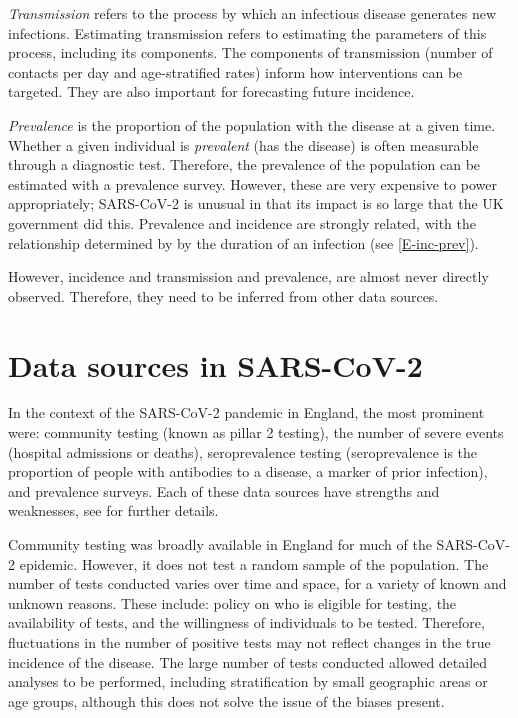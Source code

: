 \documentclass[thesis.tex]{subfiles}
\begin{document}
\emph{Transmission} refers to the process by which an infectious disease generates new infections.
Estimating transmission refers to estimating the parameters of this process, including its components.
The components of transmission (\eg number of contacts per day and age-stratified rates) inform how interventions can be targeted.
They are also important for forecasting future incidence.

\emph{Prevalence} is the proportion of the population with the disease at a given time.
Whether a given individual is \emph{prevalent} (has the disease) is often measurable through a diagnostic test.
Therefore, the prevalence of the population can be estimated with a prevalence survey.
However, these are very expensive to power appropriately; SARS-CoV-2 is unusual in that its impact is so large that the UK government did this.
Prevalence and incidence are strongly related, with the relationship determined by by the duration of an infection (see \cref{E-inc-prev}).


However, incidence and transmission and prevalence, are almost never directly observed.
Therefore, they need to be inferred from other data sources.

\section{Data sources in SARS-CoV-2} \label{intro:sec:data-sources}

In the context of the SARS-CoV-2 pandemic in England, the most prominent were: community testing (known as pillar 2 testing), the number of severe events (\eg hospital admissions or deaths), seroprevalence testing (seroprevalence is the proportion of people with antibodies to a disease, a marker of prior infection), and prevalence surveys.
Each of these data sources have strengths and weaknesses, see \textcite{royalSocietyRnumber} for further details.

Community testing was broadly available in England for much of the SARS-CoV-2 epidemic.
However, it does not test a random sample of the population.
The number of tests conducted varies over time and space, for a variety of known and unknown reasons.
These include: policy on who is eligible for testing, the availability of tests, and the willingness of individuals to be tested.
Therefore, fluctuations in the number of positive tests may not reflect changes in the true incidence of the disease.
The large number of tests conducted allowed detailed analyses to be performed, including stratification by small geographic areas or age groups, although this does not solve the issue of the biases present.
\end{document}
